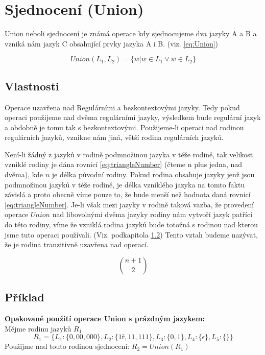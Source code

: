 \section{Sjednocení (Union)}
Union neboli sjednocení je známá operace kdy sjednocujeme dva jazyky A a B a vzniká nám jazyk C obsahující prvky jazyka A i B. (viz. \ref{eq:Union})

\begin{equation}\label{eq:Union}
Union(L_{1}, L_{2}) = \{w|w\in L_{1}\lor w\in L_{2}\}
\end{equation}

\subsection{Vlastnosti}
Operace uzavřena nad Regulárními a bezkontextovými jazyky. Tedy pokud operaci použijeme nad dvěma regulárními jazyky, výsledkem bude regulární jazyk a obdobně je tomu tak s bezkontextovými. Použijeme-li operaci nad rodinou regulárních jazyků, vznikne nám jiná, větší rodina regulárních jazyků.

Není-li žádný z jazyků v rodině podmnožinou jazyka v téže rodině, tak velikost vzniklé rodiny je dána rovnicí \ref{eq:triangleNumber} (čteme n plus jedna, nad dvěma), kde $n$ je délka původní rodiny. Pokud rodina obsahuje jazyky jenž jsou podmnožinou jazyků v téže rodině, je délka vzniklého jazyka na tomto faktu závislá a proto obecně víme pouze to, že bude menší než hodnota daná rovnicí \ref{eq:triangleNumber}. Je-li však mezi jazyky v rodině taková vazba, že provedení operace $Union$ nad libovolnými dvěma jazyky rodiny nám vytvoří jazyk patřící do této rodiny, víme že  vzniklá rodina jazyků bude totožná s rodinou nad kterou jsme tuto operaci používali. (Viz. podkapitola \ref{sec:UnionExample}) Tento vztah budeme nazývat, že je rodina tranzitivně uzavřena nad operací.

\begin{equation}\label{eq:triangleNumber}
\binom{n+1}{2}
\end{equation}

\subsection{Příklad}\label{sec:UnionExample}
\textbf{Opakované použití operace Union s prázdným jazykem:}\\
Mějme rodinu jazyků $R_{1}$
$$
	R_{1} = \{L_{1}:\{0,00,000\}, L_{2}:\{1ř,11,111\}, L_{3}:\{0,1\}, L_{4}:\{\epsilon\}, L_{5}:\{\}\}
$$
Použijme nad touto rodinou sjednocení: $R_{2} = Union(R_{1})$

